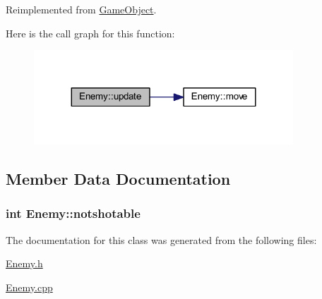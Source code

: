 Reimplemented from \hyperlink{class_game_object_ad4a07f19f6c5e2e71c89c07486f26244}{Game\+Object}.



Here is the call graph for this function\+:\nopagebreak
\begin{figure}[H]
\begin{center}
\leavevmode
\includegraphics[width=275pt]{class_enemy_aa70d742da02995011f1618acc9e303db_cgraph}
\end{center}
\end{figure}




\subsection{Member Data Documentation}
\hypertarget{class_enemy_a330c49a49d5c017292a6ab66678f853a}{}
\subsubsection[{notshotable}]{\setlength{\rightskip}{0pt plus 5cm}int Enemy\+::notshotable\hspace{0.3cm}{\ttfamily [protected]}}\label{class_enemy_a330c49a49d5c017292a6ab66678f853a}


The documentation for this class was generated from the following files\+:\begin{DoxyCompactItemize}
\item 
\hyperlink{_enemy_8h}{Enemy.\+h}\item 
\hyperlink{_enemy_8cpp}{Enemy.\+cpp}\end{DoxyCompactItemize}

